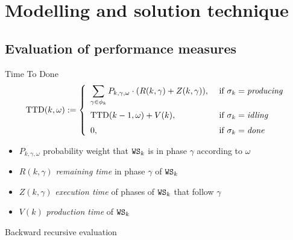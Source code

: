 
\section{Modelling and solution technique}  
  \subsection{Evaluation of performance measures}
    \begin{frame}{Time To Done}
      \begin{equation*}
        \mbox{TTD}(k,\omega) := \left\{ \begin{array}{ll}
          \displaystyle \sum_{\gamma\in \phi_k} P_{k, \gamma,\omega} \cdot (R(k,\gamma) + Z(k,\gamma)), &  \mbox{ if } \sigma_k=\mbox{\em producing}
          \medskip\\
          \mbox{TTD}(k-1,\omega) + V(k), & \mbox{ if } \sigma_k=\mbox{\em idling}
          \medskip\\
          0, & \mbox{ if } \sigma_k=\mbox{\em done}
        \end{array} \right.
        \label{eq:ttd}
      \end{equation*}
      
      \begin{itemize}
        \item $P_{k,\gamma,\omega}$ probability weight that $\mathtt{WS}_k$ is in phase $\gamma$ according to $\omega$
        \item $R(k,\gamma)$ \textit{remaining time} in phase $\gamma$ of $\mathtt{WS}_k$
        \item $Z(k,\gamma)$ \textit{execution time} of phases of $\mathtt{WS}_k$ that follow $\gamma$
        \item $V(k)$ \textit{production time} of $\mathtt{WS}_k$
      \end{itemize}
      
      \begin{center}\hspace{-0.5cm}\scalebox{0.8}{}\end{center}
      
      Backward recursive evaluation
    \end{frame}
    
